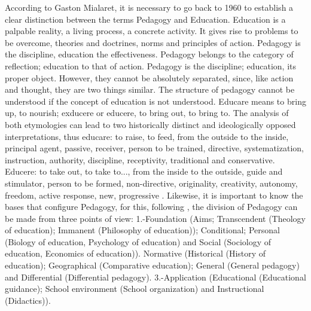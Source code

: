 \documentclass[english]{textolivre}
\begin{document}
According to Gaston Mialaret, it is necessary to go back to 1960 to establish a clear distinction between the terms Pedagogy and Education. Education is a palpable reality, a living process, a concrete activity. It gives rise to problems to be overcome, theories and doctrines, norms and principles of action. Pedagogy is the discipline, education the effectiveness. Pedagogy belongs to the category of reflection; education to that of action. Pedagogy is the discipline; education, its proper object. However, they cannot be absolutely separated, since, like action and thought, they are two things similar. The structure of pedagogy cannot be understood if the concept of education is not understood. Educare means to bring up, to nourish; exducere or educere, to bring out, to bring to. The analysis of both etymologies can lead to two historically distinct and ideologically opposed interpretations, thus educare: to raise, to feed, from the outside to the inside, principal agent, passive, receiver, person to be trained, directive, systematization, instruction, authority, discipline, receptivity, traditional and conservative. Educere: to take out, to take to..., from the inside to the outside, guide and stimulator, person to be formed, non-directive, originality, creativity, autonomy, freedom, active response, new, progressive \cite[p.8]{rotger_amengual_ciencias_1984}. Likewise, it is important to know the bases that configure Pedagogy, for this, following \textcite{sarramona_aspectos_1977}, the division of Pedagogy can be made from three points of view: 1.-Foundation (Aims; Transcendent (Theology of education); Immanent (Philosophy of education)); Conditional; Personal (Biology of education, Psychology of education) and Social (Sociology of education, Economics of education)). Normative (Historical (History of education); Geographical (Comparative education); General (General pedagogy) and Differential (Differential pedagogy). 3.-Application (Educational (Educational guidance); School environment (School organization) and Instructional (Didactics)).
\end{document}
